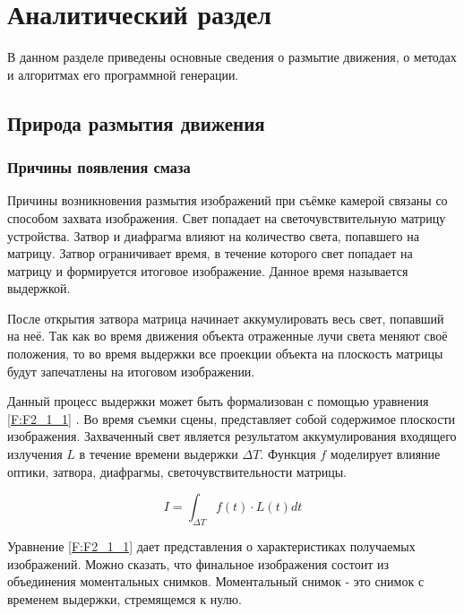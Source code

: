 \chapter{Аналитический раздел}
\label{cha:analysis}
В данном разделе приведены основные сведения о размытие движения, о методах и алгоритмах его программной генерации.

\section{Природа размытия движения}

\subsection{Причины появления смаза}

Причины возникновения размытия изображений при съёмке камерой связаны со способом захвата изображения. Свет попадает на светочувствительную матрицу устройства. Затвор и диафрагма влияют на количество света, попавшего на матрицу. Затвор ограничивает время, в течение которого свет попадает на матрицу и формируется итоговое изображение. Данное время называется выдержкой.
\par
После открытия затвора матрица начинает аккумулировать весь свет, попавший на неё. Так как во время движения объекта отраженные лучи света меняют своё положения, то во время выдержки все проекции объекта на плоскость матрицы будут запечатлены на итоговом изображении.
\par
Данный процесс выдержки может быть формализован с помощью уравнения \eqref{F:F2_1_1} . Во время съемки сцены,  представляет собой содержимое плоскости изображения. Захваченный свет является результатом аккумулирования входящего излучения $L$ в течение времени выдержки $\Delta T$. Функция $f$ моделирует влияние оптики, затвора, диафрагмы, светочувствительности матрицы.
\par
\begin{equation}
    I = \int_{\Delta T} f(t) \cdot L(t) dt
    \label{F:F2_1_1}
\end{equation}
\par
Уравнение \eqref{F:F2_1_1} дает представления о характеристиках получаемых изображений. \cite{Navarro11} Можно сказать, что финальное изображения состоит из объединения моментальных снимков. Моментальный снимок - это снимок с временем выдержки, стремящемся к нулю.

